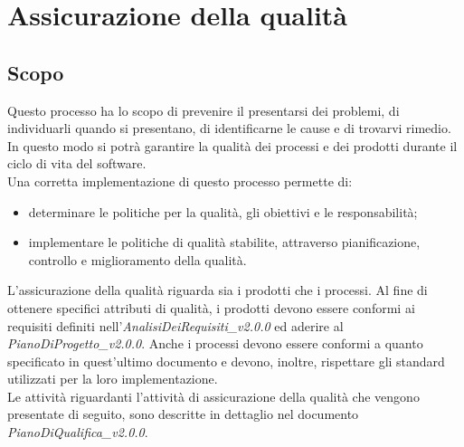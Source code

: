 \documentclass[11pt,a4paper]{article}
\begin{document}
{\appendix
\section{Assicurazione della qualità}

\subsection{Scopo}
Questo processo ha lo scopo di prevenire il presentarsi dei problemi, di individuarli quando si presentano, di identificarne le cause e di trovarvi rimedio. In questo modo si potrà garantire la qualità dei processi e dei prodotti durante il ciclo di vita del software.
\\
Una corretta implementazione di questo processo permette di:
\begin{itemize}
	\item determinare le politiche per la qualità, gli obiettivi e le responsabilità;
	\item implementare le politiche di qualità stabilite, attraverso pianificazione, controllo e miglioramento della qualità. 
\end{itemize}

L'assicurazione della qualità riguarda sia i prodotti che i processi. Al fine di ottenere specifici attributi di qualità, i prodotti devono essere conformi ai requisiti definiti nell'\textit{AnalisiDeiRequisiti\_v2.0.0} ed aderire al \textit{PianoDiProgetto\_v2.0.0}. Anche i processi devono essere conformi a quanto specificato in quest'ultimo documento e devono, inoltre, rispettare gli standard utilizzati per la loro implementazione. \\
Le attività riguardanti l'attività di assicurazione della qualità che vengono presentate di seguito, sono descritte in dettaglio nel documento \textit{PianoDiQualifica\_v2.0.0}.

}
\end{document}
